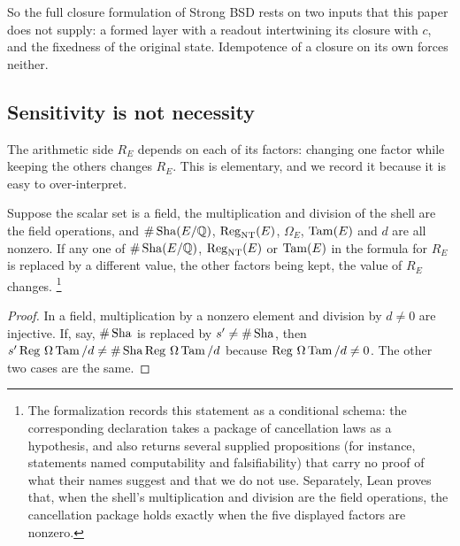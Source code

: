 So the full closure formulation of Strong BSD rests on two inputs that
this paper does not supply: a formed layer with a readout intertwining its
closure with $c$, and the fixedness of the original state.  Idempotence
of a closure on its own forces neither.

\subsection{Sensitivity is not necessity}
\label{sec:sensitivity}

The arithmetic side $R_E$ depends on each of its factors: changing one
factor while keeping the others changes $R_E$.  This is elementary, and
we record it because it is easy to over-interpret.

\begin{theorem}\label{thm:closure:composite-signature}
Suppose the scalar set is a field, the multiplication and division of
the shell are the field operations, and $\#\operatorname{Sha}(E/\mathbb{Q})$,
$\operatorname{Reg}_{\mathrm{NT}}(E)$, $\Omega_E$, $\operatorname{Tam}(E)$ and $d$ are all nonzero.
If any one of $\#\operatorname{Sha}(E/\mathbb{Q})$, $\operatorname{Reg}_{\mathrm{NT}}(E)$ or $\operatorname{Tam}(E)$ in the
formula for $R_E$ is replaced by a different value, the other factors
being kept, the value of $R_E$ changes.%
\footnote{The formalization records this statement as a conditional
schema: the corresponding declaration takes a package of cancellation
laws as a hypothesis, and also returns several supplied propositions (for
instance, statements named computability and falsifiability) that carry
no proof of what their names suggest and that we do not use.  Separately,
Lean proves that, when the shell's multiplication and division are the
field operations, the cancellation package holds exactly when the five
displayed factors are nonzero.}
\end{theorem}

\begin{proof}
In a field, multiplication by a nonzero element and division by $d\neq0$
are injective.  If, say, $\#\operatorname{Sha}$ is replaced by $s'\neq\#\operatorname{Sha}$, then
$s'\operatorname{Reg}\,\Omega\operatorname{Tam}/d\neq\#\operatorname{Sha}\operatorname{Reg}\,\Omega\operatorname{Tam}/d$ because
$\operatorname{Reg}\,\Omega\operatorname{Tam}/d\neq0$.  The other two cases are the same.
\end{proof}

